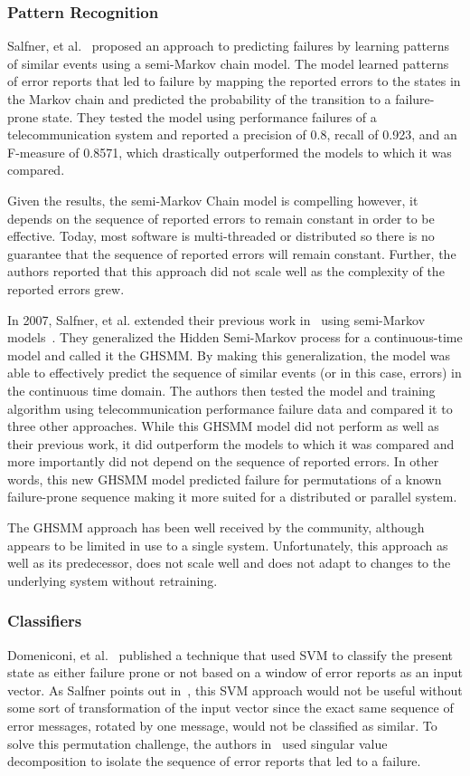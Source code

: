 \subsubsection{Pattern Recognition}
Salfner, et al.~\cite{salfner2006} proposed an approach to predicting failures
by learning patterns of similar events using a semi-Markov chain model.
The model learned patterns of error reports that led to failure by mapping the
reported errors to the states in the Markov chain and predicted the probability
of the transition to a failure-prone state.  They tested the model using
performance failures of a telecommunication system and reported a precision of
0.8, recall of 0.923, and an F-measure of 0.8571, which drastically
outperformed the models to which it was compared.

Given the results, the semi-Markov Chain model is compelling however, it
depends on the sequence of reported errors to remain constant in order to be
effective.  Today, most software is multi-threaded or distributed so there is
no guarantee that the sequence of reported errors will remain constant.
Further, the authors reported that this approach did not scale well as the
complexity of the reported errors grew.

In 2007, Salfner, et al. extended their previous work in~\cite{salfner2006}
using semi-Markov models~\cite{salfner2007}.  They generalized the Hidden
Semi-Markov process for a continuous-time model and called it the \ac{GHSMM}.
By making this generalization, the model was able to effectively predict the
sequence of similar events (or in this case, errors) in the continuous time
domain.  The authors then tested the model and training algorithm using
telecommunication performance failure data and compared it to three other
approaches.  While this \ac{GHSMM} model did not perform as well as their
previous work, it did outperform the models to which it was compared and more
importantly did not depend on the sequence of reported errors.  In other words,
this new \ac{GHSMM} model predicted failure for permutations of a known
failure-prone sequence making it more suited for a distributed or parallel
system.

The \ac{GHSMM} approach has been well received by the community, although
appears to be limited in use to a single system.  Unfortunately, this approach
as well as its predecessor, does not scale well and does not adapt to changes
to the underlying system without retraining.

\subsubsection{Classifiers}
Domeniconi, et al.~\cite{domeniconi2002} published a technique that used
\ac{SVM} to classify the present state as either failure prone or not based on
a window of error reports as an input vector.  As Salfner points out
in~\cite{salfnerSurvey}, this \ac{SVM} approach would not be useful without
some sort of transformation of the input vector since the exact same sequence
of error messages, rotated by one message, would not be classified as similar.
To solve this permutation challenge, the authors in~\cite{domeniconi2002} used
singular value decomposition to isolate the sequence of error reports that led
to a failure.

